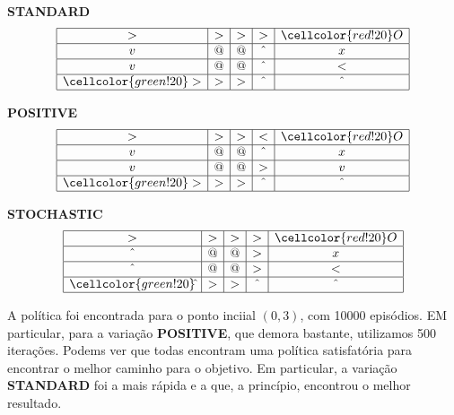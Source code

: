 \documentclass{article}
\begin{document}
\vspace{10pt}

\begin{multicols}{3}

	\centering \small \textbf{STANDARD}
	\[
		\begin{array}{|c|c|c|c|c|}
			\hline
			>                     & > & > & >      & \cellcolor{red!20}O \\ \hline
			v                     & @ & @ & \hat{} & x                   \\ \hline
			v                     & @ & @ & \hat{} & <                   \\ \hline
			\cellcolor{green!20}> & > & > & \hat{} & \hat{}              \\ \hline
		\end{array}
	\]

	\columnbreak

	\centering \small \textbf{POSITIVE}
	\[
		\begin{array}{|c|c|c|c|c|}
			\hline
			>                     & > & > & <      & \cellcolor{red!20}O \\ \hline
			v                     & @ & @ & \hat{} & x                   \\ \hline
			v                     & @ & @ & >      & v                   \\ \hline
			\cellcolor{green!20}> & > & > & \hat{} & \hat{}              \\ \hline
		\end{array}
	\]

	\columnbreak

	\centering \small \textbf{STOCHASTIC}
	\[
		\begin{array}{|c|c|c|c|c|}
			\hline
			>                          & > & > & >      & \cellcolor{red!20}O \\ \hline
			\hat{}                     & @ & @ & >      & x                   \\ \hline
			\hat{}                     & @ & @ & >      & <                   \\ \hline
			\cellcolor{green!20}\hat{} & > & > & \hat{} & \hat{}              \\ \hline
		\end{array}
	\]

\end{multicols}

A política foi encontrada para o ponto inciial \((0, 3)\), com 10000 episódios. EM particular, para a variação \textbf{POSITIVE}, que demora bastante, utilizamos 500 iterações. Podems ver que todas encontram uma política satisfatória
para encontrar o melhor caminho para o objetivo. Em particular, a variação \textbf{STANDARD} foi a mais rápida e a que, a princípio, encontrou o melhor resultado.
\end{document}
